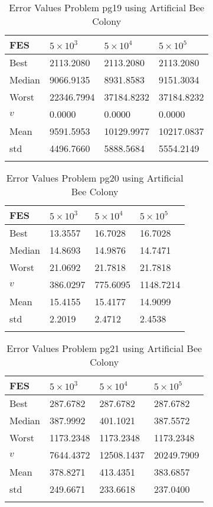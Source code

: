 \documentclass[10pt, a4paper]{book}
\begin{document}
\begin{center}
\begin{longtable}{l l l l}
FES & $5 \times 10^{3}$ & $5 \times 10^{4}$ & $5 \times 10^{5}$ \\
\hline
Best & 2113.2080 & 2113.2080 & 2113.2080 \\
Median & 9066.9135 & 8931.8583 & 9151.3034 \\
Worst & 22346.7994 & 37184.8232 & 37184.8232 \\
$v$ & 0.0000 & 0.0000 & 0.0000 \\
Mean & 9591.5953 & 10129.9977 & 10217.0837 \\
std & 4496.7660 & 5888.5684 & 5554.2149 \\
\caption{ Error Values Problem pg19 using Artificial Bee Colony }
\end{longtable}
\end{center}

\begin{center}
\begin{longtable}{l l l l}
FES & $5 \times 10^{3}$ & $5 \times 10^{4}$ & $5 \times 10^{5}$ \\
\hline
Best & 13.3557 & 16.7028 & 16.7028 \\
Median & 14.8693 & 14.9876 & 14.7471 \\
Worst & 21.0692 & 21.7818 & 21.7818 \\
$v$ & 386.0297 & 775.6095 & 1148.7214 \\
Mean & 15.4155 & 15.4177 & 14.9099 \\
std & 2.2019 & 2.4712 & 2.4538 \\
\caption{ Error Values Problem pg20 using Artificial Bee Colony }
\end{longtable}
\end{center}

\begin{center}
\begin{longtable}{l l l l}
FES & $5 \times 10^{3}$ & $5 \times 10^{4}$ & $5 \times 10^{5}$ \\
\hline
Best & 287.6782 & 287.6782 & 287.6782 \\
Median & 387.9992 & 401.1021 & 387.5572 \\
Worst & 1173.2348 & 1173.2348 & 1173.2348 \\
$v$ & 7644.4372 & 12508.1437 & 20249.7909 \\
Mean & 378.8271 & 413.4351 & 383.6857 \\
std & 249.6671 & 233.6618 & 237.0400 \\
\caption{ Error Values Problem pg21 using Artificial Bee Colony }
\end{longtable}
\end{center}
\end{document}
